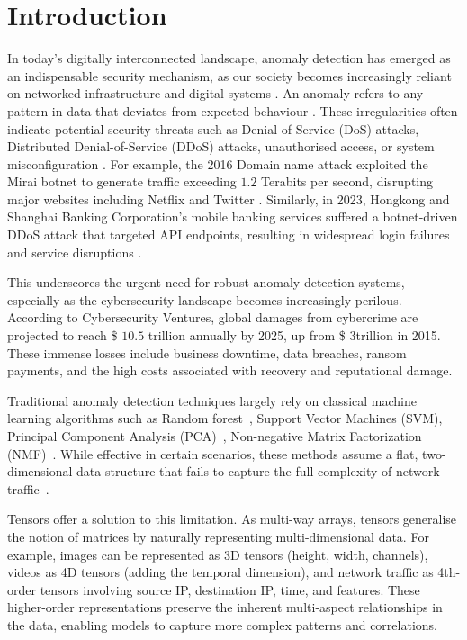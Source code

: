 \documentclass[preprint,12pt,authoryear]{elsarticle}
\begin{document}
\section{Introduction}
In today's digitally interconnected landscape, anomaly detection has emerged as an indispensable security mechanism, as our society becomes increasingly reliant on networked infrastructure and digital systems \citep{rcglobal2021} . An anomaly refers to any pattern in data that deviates from expected behaviour \citep{patcha2007overview}. These irregularities often indicate potential security threats such as Denial-of-Service (DoS) attacks, Distributed Denial-of-Service (DDoS) attacks, unauthorised access, or system misconfiguration \citep{eren2023general}. For example, the 2016 Domain name attack exploited the Mirai botnet to generate traffic exceeding $1.2$ Terabits per second, disrupting major websites including Netflix and Twitter \citep{hilton2016dyn}. Similarly, in 2023, Hongkong and Shanghai Banking Corporation's mobile banking services suffered a botnet-driven DDoS attack that targeted API endpoints, resulting in widespread login failures and service disruptions \citep{paloaltonetworks2024}.

This underscores the urgent need for robust anomaly detection systems, especially as the cybersecurity landscape becomes increasingly perilous. According to Cybersecurity Ventures, global damages from cybercrime are projected to reach  \$ $10.5$ trillion annually by 2025, up from \$ $3 $trillion in 2015. These immense losses include business downtime, data breaches, ransom payments, and the high costs associated with recovery and reputational damage. 

Traditional anomaly detection techniques largely rely on classical machine learning algorithms such as Random forest~\citep{biau2016randomforest}, Support Vector Machines (SVM), Principal Component Analysis (PCA)~\citep{marukatat2022tutorial}, Non-negative Matrix Factorization (NMF)~\citep{lee2000nmf}. While effective in certain scenarios, these methods assume a flat, two-dimensional data structure that fails to capture the full complexity of network traffic~\citep{Su2025Robust}. 

Tensors offer a solution to this limitation. As multi-way arrays, tensors generalise the notion of matrices by naturally representing multi-dimensional data. For example, images can be represented as 3D tensors (height, width, channels), videos as 4D tensors (adding the temporal dimension), and network traffic as 4th-order tensors involving source IP, destination IP, time, and features. These higher-order representations preserve the inherent multi-aspect relationships in the data, enabling models to capture more complex patterns and correlations. 
\end{document}
